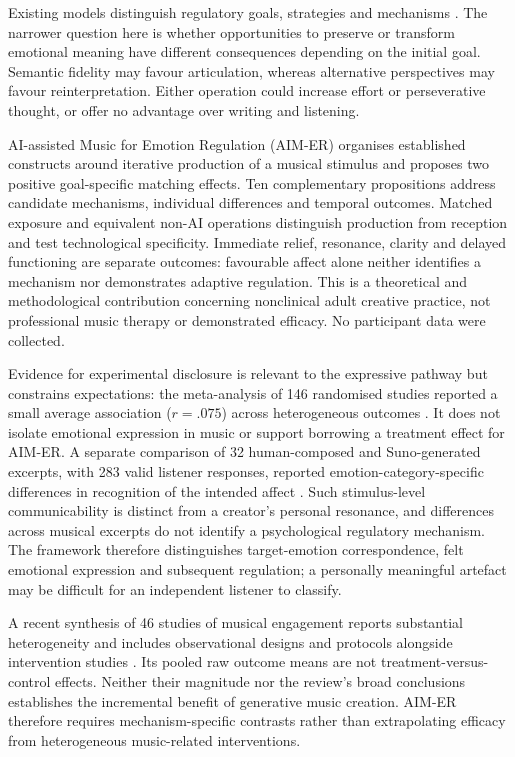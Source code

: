 \documentclass[11pt,a4paper]{article}
\begin{document}
Existing models distinguish regulatory goals, strategies and mechanisms \citep{baltazar2016,baltazar2019,gross2015}. The narrower question here is whether opportunities to preserve or transform emotional meaning have different consequences depending on the initial goal. Semantic fidelity may favour articulation, whereas alternative perspectives may favour reinterpretation. Either operation could increase effort or perseverative thought, or offer no advantage over writing and listening.

AI-assisted Music for Emotion Regulation (AIM-ER) organises established constructs around iterative production of a musical stimulus and proposes two positive goal-specific matching effects. Ten complementary propositions address candidate mechanisms, individual differences and temporal outcomes. Matched exposure and equivalent non-AI operations distinguish production from reception and test technological specificity. Immediate relief, resonance, clarity and delayed functioning are separate outcomes: favourable affect alone neither identifies a mechanism nor demonstrates adaptive regulation. This is a theoretical and methodological contribution concerning nonclinical adult creative practice, not professional music therapy or demonstrated efficacy. No participant data were collected.

Evidence for experimental disclosure is relevant to the expressive pathway but constrains expectations: the meta-analysis of 146 randomised studies reported a small average association ($r=.075$) across heterogeneous outcomes \citep{frattaroli2006}. It does not isolate emotional expression in music or support borrowing a treatment effect for AIM-ER. A separate comparison of 32 human-composed and Suno-generated excerpts, with 283 valid listener responses, reported emotion-category-specific differences in recognition of the intended affect \citep{qi2026}. Such stimulus-level communicability is distinct from a creator's personal resonance, and differences across musical excerpts do not identify a psychological regulatory mechanism. The framework therefore distinguishes target-emotion correspondence, felt emotional expression and subsequent regulation; a personally meaningful artefact may be difficult for an independent listener to classify.

A recent synthesis of 46 studies of musical engagement reports substantial heterogeneity and includes observational designs and protocols alongside intervention studies \citep{feng2026}. Its pooled raw outcome means are not treatment-versus-control effects. Neither their magnitude nor the review's broad conclusions establishes the incremental benefit of generative music creation. AIM-ER therefore requires mechanism-specific contrasts rather than extrapolating efficacy from heterogeneous music-related interventions.
\end{document}

